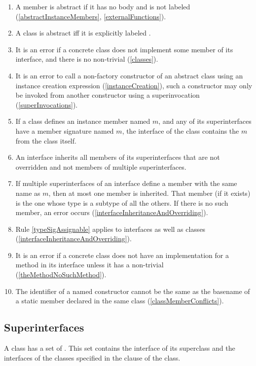 \documentclass[makeidx]{article}
\begin{document}
{\begin{enumerate}
\item A member is abstract if
  it has no body and is not labeled \EXTERNAL{}
  (\ref{abstractInstanceMembers}, \ref{externalFunctions}).
\item A class is abstract if{}f it is explicitly labeled \ABSTRACT.
\item It is an error if a concrete class does not implement some member
  of its interface, and there is no non-trivial 
  (\ref{classes}).
\item It is an error to call a non-factory constructor of an abstract class
  using an instance creation expression (\ref{instanceCreation}),
  such a constructor may only be invoked from another constructor
  using a superinvocation (\ref{superInvocations}).
\item If a class defines an instance member named $m$,
  and any of its superinterfaces have a member signature named $m$,
  the interface of the class contains the $m$ from the class itself.
\item An interface inherits all members of its superinterfaces
  that are not overridden and not members of multiple superinterfaces.
\item If multiple superinterfaces of an interface
  define a member with the same name as $m$,
  then at most one member is inherited.
  That member (if it exists) is the one whose type is a subtype
  of all the others.
  If there is no such member, an error occurs
  (\ref{interfaceInheritanceAndOverriding}).
\item Rule \ref{typeSigAssignable} applies to interfaces as well as classes
  (\ref{interfaceInheritanceAndOverriding}).
\item It is an error if a concrete class does not have an implementation
  for a method in its interface
  unless it has a non-trivial 
  (\ref{theMethodNoSuchMethod}).
\item The identifier of a named constructor cannot be the same as
  the basename of a static member declared in the same class
  (\ref{classMemberConflicts}).
\end{enumerate}%
}


\subsection{Superinterfaces}

\LMHash{}%
A class has a set of .
This set contains the interface of its superclass
and the interfaces of the classes specified in
the \IMPLEMENTS{} clause of the class.
\end{document}
